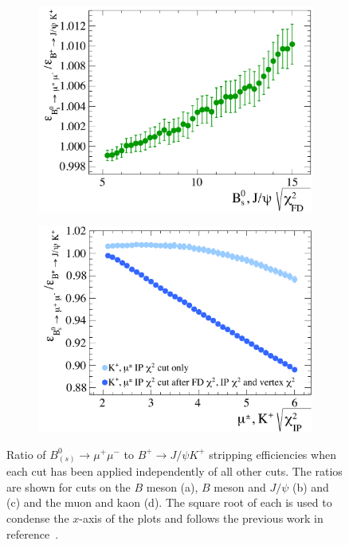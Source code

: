 \begin{figure}[p]
\begin{subfigure}[b]{0.48\textwidth}
    \includegraphics[width=\textwidth]{./Figs/Selection/B2JpsiK_FD.pdf}
    \caption{}
    \label{fig:JpsiFD}
  \end{subfigure}
  \begin{subfigure}[b]{0.48\textwidth}
    \includegraphics[width=\textwidth]{./Figs/Selection/B2JpsiK_daugt.pdf}
    \caption{}
    \label{fig:JpsidaugtIP}
  \end{subfigure}
  \caption{Ratio of $B^{0}_{(s)}\to\mu^{+} \mu^{-}$ to $B^{+}\to J/\psi K^{+}$ stripping efficiencies when each cut has been applied independently of all other cuts. The ratios are shown for cuts on the $B$ meson \chiIP (a), $B$ meson and $J/\psi$ \chivtx (b) and \chiFD (c) and the muon and kaon \chiIP (d). The square root of each \chisqd is used to condense the $x$-axis of the plots and follows the previous work in reference~\cite{Diego}.}
  \label{fig:BJpsiK}
\end{figure}


